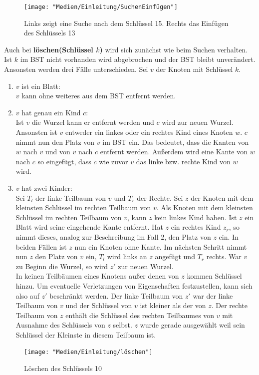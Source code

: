 \documentclass[a4paper,12pt]{article}
\begin{document}
\begin{figure}[h]
	\centering
	\texttt{[image: "Medien/Einleitung/SuchenEinfügen"]}
	\caption{Links zeigt eine Suche nach dem Schlüssel 15. Rechts das Einfügen des Schlüssels 13}
	\label{fig:SuchenEinfügen}
\end{figure}
\noindent Auch bei \textbf{löschen(Schlüssel $k$)} wird sich zunächst wie beim Suchen verhalten. Ist $k$ im BST nicht vorhanden wird abgebrochen und der BST bleibt unverändert. Ansonsten werden drei Fälle unterschieden.
Sei $v$ der Knoten mit Schlüssel $k$.
\begin{enumerate}
	\item $v$ ist ein Blatt: \\
	$v$ kann ohne weiteres aus dem BST entfernt werden.
	\item $v$ hat genau ein Kind $c$:\\
	Ist $v$ die Wurzel kann er entfernt werden und $c$ wird zur neuen Wurzel. Ansonsten ist $v$ entweder ein linkes oder ein rechtes Kind eines Knoten $w$. $c$ nimmt nun den Platz von $v$ im BST ein. Das bedeutet, dass die Kanten von $w$ nach $v$ und von $v$ nach $c$ entfernt werden. Außerdem wird eine Kante von $w$ nach $c$ so eingefügt, dass $c$ wie zuvor $v$ das linke bzw. rechte Kind von $w$ wird. 
	\item $v$ hat zwei Kinder:\\
	Sei $T_l$ der linke Teilbaum von $v$ und $T_r$ der Rechte.
	Sei $z$ der Knoten mit dem kleinsten Schlüssel im rechten Teilbaum von $v$. Als Knoten mit dem kleinsten Schlüssel im rechten Teilbaum von $v$, kann $z$ kein linkes Kind haben. Ist $z$ ein Blatt wird seine eingehende Kante entfernt. Hat $z$ ein rechtes Kind $z_r$, so nimmt dieses, analog zur Beschreibung im Fall 2, den Platz von $z$ ein. In beiden Fällen ist $z$ nun ein Knoten ohne Kante. Im nächsten Schritt nimmt nun $z$ den Platz von $v$ ein, $T_l$ wird links an $z$ angefügt und $T_r$ rechts. War $v$ zu Beginn die Wurzel, so wird $z'$ zur neuen Wurzel.\\
	In keinen Teilbäumen eines Knotens außer denen von $z$ kommen Schlüssel hinzu. Um eventuelle Verletzungen von Eigenschaften festzustellen, kann sich also auf $z'$ beschränkt werden. Der linke Teilbaum von $z'$ war der linke Teilbaum von $v$ und der Schlüssel von $v$ ist kleiner als der von $z$. Der rechte Teilbaum von $z$ enthält die Schlüssel des rechten Teilbaumes von $v$ mit Ausnahme des Schlüssels von $z$ selbst. $z$ wurde gerade ausgewählt weil sein Schlüssel der Kleinste in diesem Teilbaum ist. 
	
	
	
	
\end{enumerate} 
\begin{figure}[h]
	\centering
	\texttt{[image: "Medien/Einleitung/löschen"]}
	\caption{Löschen des Schlüssels 10}
	\label{fig:löschen}
\end{figure}
\end{document}
